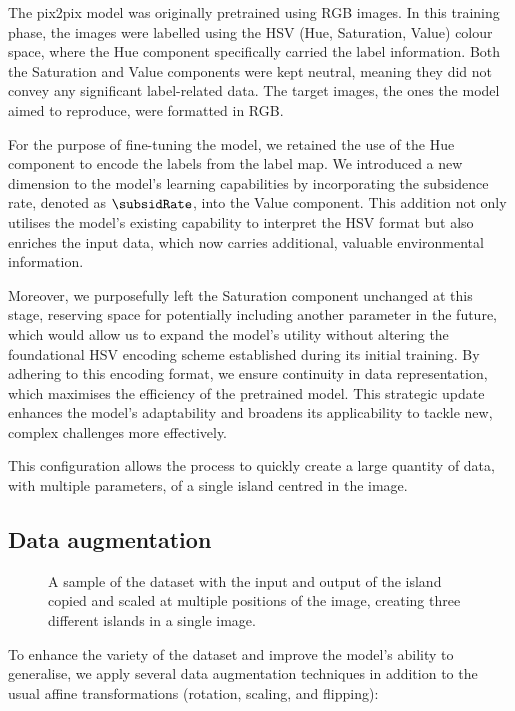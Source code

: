 The pix2pix model was originally pretrained using RGB images. In this training phase, the images were labelled using the HSV (Hue, Saturation, Value) colour space, where the Hue component specifically carried the label information. Both the Saturation and Value components were kept neutral, meaning they did not convey any significant label-related data. The target images, the ones the model aimed to reproduce, were formatted in RGB.

For the purpose of fine-tuning the model, we retained the use of the Hue component to encode the labels from the label map. We introduced a new dimension to the model's learning capabilities by incorporating the subsidence rate, denoted as $\subsidRate$, into the Value component. This addition not only utilises the model's existing capability to interpret the HSV format but also enriches the input data, which now carries additional, valuable environmental information.

Moreover, we purposefully left the Saturation component unchanged at this stage, reserving space for potentially including another parameter in the future, which would allow us to expand the model's utility without altering the foundational HSV encoding scheme established during its initial training. By adhering to this encoding format, we ensure continuity in data representation, which maximises the efficiency of the pretrained model. This strategic update enhances the model's adaptability and broadens its applicability to tackle new, complex challenges more effectively.

This configuration allows the process to quickly create a large quantity of data, with multiple parameters, of a single island centred in the image.

\subsection{Data augmentation}
\label{sec:coral-island-data-augmentation}

\begin{figure}[H]
\caption{A sample of the dataset with the input and output of the island copied and scaled at multiple positions of the image, creating three different islands in a single image.}
\label{fig:coral-island-cGAN-examples}
\end{figure}

To enhance the variety of the dataset and improve the model's ability to generalise, we apply several data augmentation techniques in addition to the usual affine transformations (rotation, scaling, and flipping):


